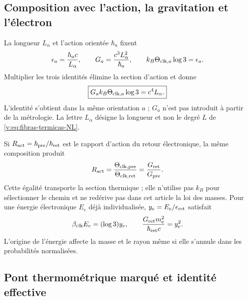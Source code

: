 \subsection{Composition avec l’action, la gravitation et l’électron}

La longueur $L_\alpha$ et l’action orientée $\hbar_a$ fixent
\begin{equation}
 \epsilon_a=\frac{\hbar_ac}{L_\alpha},\qquad
 G_a=\frac{c^3L_\alpha^2}{\hbar_a},\qquad
 k_B\Theta_{{\rm clk},a}\log3=\epsilon_a.
 \label{v:eq:triple-accion-gravedad-temperatura}
\end{equation}
Multiplier les trois identités élimine la section d’action et donne
\begin{equation}
 \boxed{G_a k_B\Theta_{{\rm clk},a}\log3=c^4L_\alpha.}
 \label{v:eq:identidad-gravedad-temperatura}
\end{equation}
L’identité s’obtient dans la même orientation $a$ ; $G_a$ n’est pas introduit
à partir de la métrologie. La lettre $L_\alpha$ désigne la longueur et non le degré $L$ de
\eqref{v:eq:fibras-termicas-NL}.

Si $R_{\rm act}=\hbar_{\rm pre}/\hbar_{\rm ret}$ est le rapport d’action du
retour électronique, la même composition produit
\begin{equation}
 R_{\rm act}
 =\frac{\Theta_{{\rm clk,pre}}}{\Theta_{{\rm clk,ret}}}
 =\frac{G_{\rm ret}}{G_{\rm pre}}.
 \label{v:eq:retorno-accion-termico-gravitatorio}
\end{equation}
Cette égalité transporte la section thermique ; elle n’utilise pas $k_B$ pour sélectionner
le chemin et ne redérive pas dans cet article la loi des masses. Pour une énergie
électronique $E_e$ déjà individualisée, $y_e=E_e/\epsilon_{\rm ret}$ satisfait
\[
 \beta_{\rm clk}E_e=(\log3)y_e,\qquad
 \frac{G_{\rm ret}m_e^2}{\hbar_{\rm ret}c}=y_e^2.
\]
L’origine de l’énergie affecte la masse et le rayon même si elle s’annule dans les probabilités
normalisées.

\subsection{Pont thermométrique marqué et identité effective}

